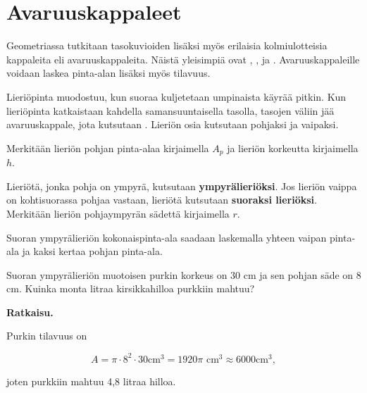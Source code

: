 \section*{Avaruuskappaleet}
Geometriassa tutkitaan tasokuvioiden lisäksi myös erilaisia kolmiulotteisia kappaleita eli avaruuskappaleita. Näistä yleisimpiä ovat , ,  ja . Avaruuskappaleille voidaan laskea pinta-alan lisäksi myös tilavuus.


Lieriöpinta muodostuu, kun suoraa kuljetetaan umpinaista käyrää pitkin. Kun lieriöpinta katkaistaan kahdella samansuuntaisella tasolla, tasojen väliin jää avaruuskappale, jota kutsutaan . Lieriön osia kutsutaan pohjaksi ja vaipaksi.

Merkitään lieriön pohjan pinta-alaa kirjaimella $A_p$ ja lieriön korkeutta kirjaimella $h$.


Lieriötä, jonka pohja on ympyrä, kutsutaan \textbf{ympyrälieriöksi}. Jos lieriön vaippa on kohtisuorassa pohjaa vastaan, lieriötä kutsutaan \textbf{suoraksi lieriöksi}. Merkitään lieriön pohjaympyrän sädettä kirjaimella $r$.


Suoran ympyrälieriön kokonaispinta-ala saadaan laskemalla yhteen vaipan pinta-ala ja kaksi kertaa pohjan pinta-ala.


\begin{esimerkki}
Suoran ympyrälieriön muotoisen purkin korkeus on 30 cm ja sen pohjan säde on 8 cm. Kuinka monta litraa kirsikkahilloa purkkiin mahtuu?

\textbf{Ratkaisu.}

Purkin tilavuus on

$$A=\pi\cdot 8^2 \cdot 30 \text{cm}^3 = 1920 \pi \text{ cm}^3 \approx 6000 \text{cm}^3,$$

joten purkkiin mahtuu 4,8 litraa hilloa.
\end{esimerkki}

